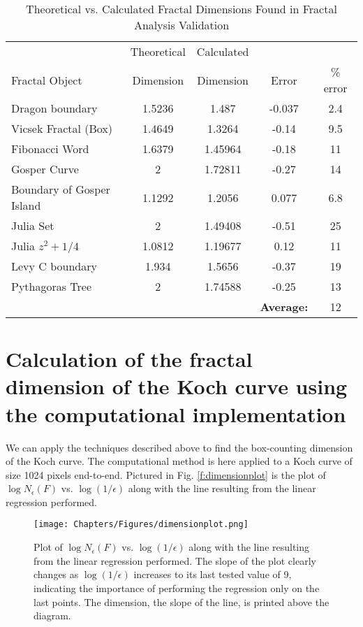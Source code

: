 \begin{table*}[ht]
\begin{center}
\caption{Theoretical vs. Calculated Fractal Dimensions Found in Fractal Analysis Validation}\label{t:table}
\begin{tabular}{lcccc}
							&	Theoretical				&	Calculated				&				& \\
Fractal Object 				&	Dimension				&	Dimension 				&	Error		&	\% error\\
\hline
Dragon boundary				&	1.5236					&	1.487	                &	-0.037		&	2.4	\\
Vicsek Fractal (Box)		& 	1.4649					&	1.3264					&	-0.14		&	9.5	\\
Fibonacci Word				&	1.6379					&	1.45964					&	-0.18 		&	11	\\
Gosper Curve				&	2						&	1.72811					&	-0.27		&	14				\\
Boundary of Gosper Island	&	1.1292					&	1.2056					&	0.077		&	6.8	\\
Julia Set					&	2						&	1.49408					&	-0.51		&	25	\\
Julia $z^2+1/4$				&	1.0812					&	1.19677					&	0.12		&	11	\\
Levy C boundary				&	1.934					&	1.5656					&	-0.37		&	19	\\
Pythagoras Tree				&	2						&	1.74588					&	-0.25		&	13	\\
\hline
							&							&							& \textbf{Average: } & 12\\
\end{tabular}
\end{center}
\end{table*}


\section{Calculation of the fractal dimension of the Koch curve using the computational implementation}

We can apply the techniques described above to find the box-counting dimension of the Koch curve. The computational method is here applied to a Koch curve of size 1024 pixels end-to-end. Pictured in Fig. \ref{f:dimensionplot} is the plot of $\log N_\epsilon (F)$ vs. $\log(1/\epsilon)$ along with the line resulting from the linear regression performed.

\begin{figure}[ht]\label{fig:dimensionplot}
\centering
\texttt{[image: Chapters/Figures/dimensionplot.png]} 
\caption[Dimension plot]{Plot of $\log N_\epsilon (F)$ vs. $\log(1/\epsilon)$ along with the line resulting from the linear regression performed. The slope of the plot clearly changes as $\log(1/\epsilon)$ increases to its last tested value of 9, indicating the importance of performing the regression only on the last points. The dimension, the slope of the line, is printed above the diagram.}
\end{figure}

